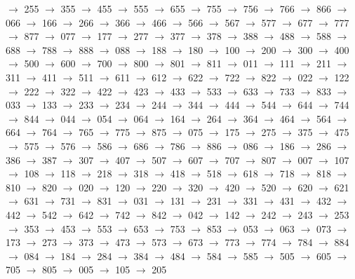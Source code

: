 $\rightarrow$ 255 $\rightarrow$ 355 $\rightarrow$ 455 $\rightarrow$ 555 $\rightarrow$ 655 $\rightarrow$ 755 $\rightarrow$ 756 $\rightarrow$ 766 $\rightarrow$ 866 $\rightarrow$ 066 $\rightarrow$ 166 $\rightarrow$ 266 $\rightarrow$ 366 $\rightarrow$ 466 $\rightarrow$ 566 $\rightarrow$ 567 $\rightarrow$ 577 $\rightarrow$ 677 $\rightarrow$ 777 $\rightarrow$ 877 $\rightarrow$ 077 $\rightarrow$ 177 $\rightarrow$ 277 $\rightarrow$ 377 $\rightarrow$ 378 $\rightarrow$ 388 $\rightarrow$ 488 $\rightarrow$ 588 $\rightarrow$ 688 $\rightarrow$ 788 $\rightarrow$ 888 $\rightarrow$ 088 $\rightarrow$ 188 $\rightarrow$ 180 $\rightarrow$ 100 $\rightarrow$ 200 $\rightarrow$ 300 $\rightarrow$ 400 $\rightarrow$ 500 $\rightarrow$ 600 $\rightarrow$ 700 $\rightarrow$ 800 $\rightarrow$ 801 $\rightarrow$ 811 $\rightarrow$ 011 $\rightarrow$ 111 $\rightarrow$ 211 $\rightarrow$ 311 $\rightarrow$ 411 $\rightarrow$ 511 $\rightarrow$ 611 $\rightarrow$ 612 $\rightarrow$ 622 $\rightarrow$ 722 $\rightarrow$ 822 $\rightarrow$ 022 $\rightarrow$ 122 $\rightarrow$ 222 $\rightarrow$ 322 $\rightarrow$ 422 $\rightarrow$ 423 $\rightarrow$ 433 $\rightarrow$ 533 $\rightarrow$ 633 $\rightarrow$ 733 $\rightarrow$ 833 $\rightarrow$ 033 $\rightarrow$ 133 $\rightarrow$ 233 $\rightarrow$ 234 $\rightarrow$ 244 $\rightarrow$ 344 $\rightarrow$ 444 $\rightarrow$ 544 $\rightarrow$ 644 $\rightarrow$ 744 $\rightarrow$ 844 $\rightarrow$ 044 $\rightarrow$ 054 $\rightarrow$ 064 $\rightarrow$ 164 $\rightarrow$ 264 $\rightarrow$ 364 $\rightarrow$ 464 $\rightarrow$ 564 $\rightarrow$ 664 $\rightarrow$ 764 $\rightarrow$ 765 $\rightarrow$ 775 $\rightarrow$ 875 $\rightarrow$ 075 $\rightarrow$ 175 $\rightarrow$ 275 $\rightarrow$ 375 $\rightarrow$ 475 $\rightarrow$ 575 $\rightarrow$ 576 $\rightarrow$ 586 $\rightarrow$ 686 $\rightarrow$ 786 $\rightarrow$ 886 $\rightarrow$ 086 $\rightarrow$ 186 $\rightarrow$ 286 $\rightarrow$ 386 $\rightarrow$ 387 $\rightarrow$ 307 $\rightarrow$ 407 $\rightarrow$ 507 $\rightarrow$ 607 $\rightarrow$ 707 $\rightarrow$ 807 $\rightarrow$ 007 $\rightarrow$ 107 $\rightarrow$ 108 $\rightarrow$ 118 $\rightarrow$ 218 $\rightarrow$ 318 $\rightarrow$ 418 $\rightarrow$ 518 $\rightarrow$ 618 $\rightarrow$ 718 $\rightarrow$ 818 $\rightarrow$ 810 $\rightarrow$ 820 $\rightarrow$ 020 $\rightarrow$ 120 $\rightarrow$ 220 $\rightarrow$ 320 $\rightarrow$ 420 $\rightarrow$ 520 $\rightarrow$ 620 $\rightarrow$ 621 $\rightarrow$ 631 $\rightarrow$ 731 $\rightarrow$ 831 $\rightarrow$ 031 $\rightarrow$ 131 $\rightarrow$ 231 $\rightarrow$ 331 $\rightarrow$ 431 $\rightarrow$ 432 $\rightarrow$ 442 $\rightarrow$ 542 $\rightarrow$ 642 $\rightarrow$ 742 $\rightarrow$ 842 $\rightarrow$ 042 $\rightarrow$ 142 $\rightarrow$ 242 $\rightarrow$ 243 $\rightarrow$ 253 $\rightarrow$ 353 $\rightarrow$ 453 $\rightarrow$ 553 $\rightarrow$ 653 $\rightarrow$ 753 $\rightarrow$ 853 $\rightarrow$ 053 $\rightarrow$ 063 $\rightarrow$ 073 $\rightarrow$ 173 $\rightarrow$ 273 $\rightarrow$ 373 $\rightarrow$ 473 $\rightarrow$ 573 $\rightarrow$ 673 $\rightarrow$ 773 $\rightarrow$ 774 $\rightarrow$ 784 $\rightarrow$ 884 $\rightarrow$ 084 $\rightarrow$ 184 $\rightarrow$ 284 $\rightarrow$ 384 $\rightarrow$ 484 $\rightarrow$ 584 $\rightarrow$ 585 $\rightarrow$ 505 $\rightarrow$ 605 $\rightarrow$ 705 $\rightarrow$ 805 $\rightarrow$ 005 $\rightarrow$ 105 $\rightarrow$ 205 